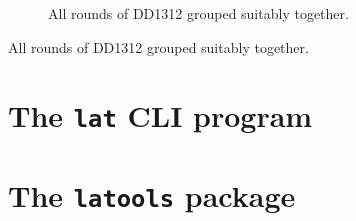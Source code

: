 \begin{figure}
\centering
%
\caption{All rounds of DD1312 grouped suitably together.}
\label{DD1312-grouped-figure}
\end{figure}

\begin{table}
\centering
%
\caption{All rounds of DD1312 grouped suitably together.}
\label{DD1312-grouped-table}
\end{table}


\chapter{The \texttt{lat} CLI program}




\chapter{The \texttt{latools} package}



